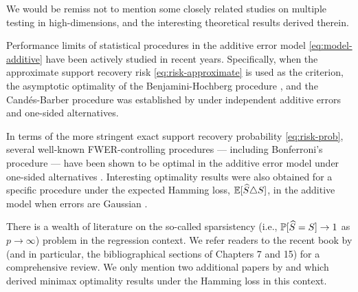 

We would be remiss not to mention some closely related studies on multiple testing in high-dimensions, and the interesting theoretical results derived therein.

Performance limits of statistical procedures in the additive error model \eqref{eq:model-additive} have been actively studied in recent years.
Specifically, when the approximate support recovery risk \eqref{eq:risk-approximate} is used as the criterion, the asymptotic optimality of the Benjamini-Hochberg procedure \cite{benjamini1995controlling}, and the Cand\'es-Barber procedure \cite{barber2015controlling} was established by \citet*{arias2017distribution} under independent additive errors and one-sided alternatives.

In terms of the more stringent exact support recovery probability \eqref{eq:risk-prob}, several well-known FWER-controlling procedures --- including Bonferroni's procedure --- have been shown to be optimal in the additive error model under one-sided alternatives \cite{gao2018fundamental}.
Interesting optimality results were also obtained for a specific procedure under the expected Hamming loss, $\E[\widehat{S}\triangle S]$, in the additive model when errors are Gaussian \cite{butucea2018variable}.

There is a wealth of literature on the so-called sparsistency (i.e., $\P[\widehat{S} = S]\to 1$ as $p\to\infty$) problem in the regression context. 
We refer readers to the recent book by \citet{wainwright2019high} (and in particular, the bibliographical sections of Chapters 7 and 15) for a comprehensive review.
We only mention two additional papers by \citet{ji2012ups} and \citet{jin2014optimality} which derived minimax optimality results under the Hamming loss in this context.

